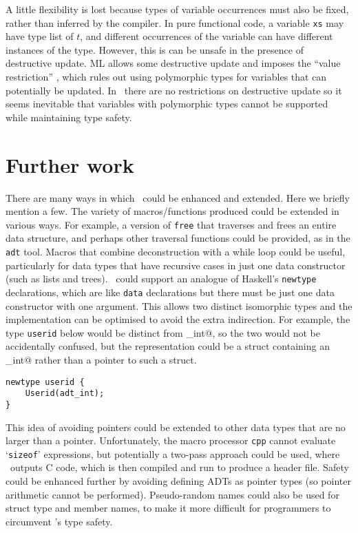 A little flexibility is lost because types of variable occurrences must
also be fixed, rather than inferred by the compiler.  In pure functional
code, a variable \texttt{xs} may have type list of $t$, and different
occurrences of the variable can have different instances of the type.
However, this is can be unsafe in the presence of destructive update.
ML allows some destructive update and imposes the ``value restriction''
\cite{mlvalrest}, which rules out using polymorphic types for variables that
can potentially be updated.  In \adtpp\ there are no restrictions on
destructive update so it seems inevitable that variables with polymorphic
types cannot be supported while maintaining type safety.

\section{Further work}
\label{sec-further}

There are many ways in which \adtpp\ could be enhanced and extended.
Here we briefly mention a few.  The variety of macros/functions
produced could be extended in various ways.  For example, a version of
\texttt{free} that traverses and frees an entire data structure, and
perhaps other traversal functions could be provided, as in the \texttt{adt}
tool.  Macros that combine deconstruction with a while loop could be
useful, particularly for data types that have recursive cases in just
one data constructor (such as lists and trees).  \Adtpp\ could support
an analogue of Haskell's \texttt{newtype} declarations, which are like
\texttt{data} declarations but there must be just one data constructor
with one argument.  This allows two distinct isomorphic types and
the implementation can be optimised to avoid the extra indirection.
For example, the type \texttt{userid} below would be distinct from
\verb@adt_int@, so the two would not be accidentally confused, but the
representation could be a struct containing an \verb@adt_int@ rather
than a pointer to such a struct.

\begin{verbatim}
newtype userid {
    Userid(adt_int);
}
\end{verbatim}

This idea of avoiding pointers could be extended to other data types
that are no larger than a pointer.  Unfortunately, the macro processor
\texttt{cpp} cannot evaluate `\texttt{sizeof}' expressions, but
potentially a two-pass approach could be used, where \adtpp\ outputs C
code, which is then compiled and run to produce a header file.
Safety could be enhanced further by avoiding defining ADTs as pointer
types (so pointer arithmetic cannot be performed). Pseudo-random names
could also be used for struct type and member names, to make it more
difficult for programmers to circumvent \adtpp's type safety.

